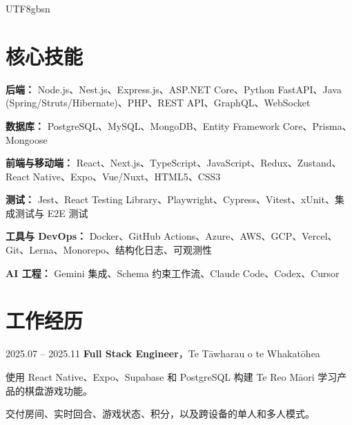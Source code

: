 \documentclass[10pt, letterpaper]{article}
\begin{document}
\begin{CJK*}{UTF8}{gbsn}
    \section{核心技能}
        \begin{onecolentry}
            \textbf{后端：} Node.js、Nest.js、Express.js、ASP.NET Core、Python FastAPI、Java (Spring/Struts/Hibernate)、PHP、REST API、GraphQL、WebSocket
        \end{onecolentry}
        \vspace{0.15 cm}
        \begin{onecolentry}
            \textbf{数据库：} PostgreSQL、MySQL、MongoDB、Entity Framework Core、Prisma、Mongoose
        \end{onecolentry}
        \vspace{0.15 cm}
        \begin{onecolentry}
            \textbf{前端与移动端：} React、Next.js、TypeScript、JavaScript、Redux、Zustand、React Native、Expo、Vue/Nuxt、HTML5、CSS3
        \end{onecolentry}
        \vspace{0.15 cm}
        \begin{onecolentry}
            \textbf{测试：} Jest、React Testing Library、Playwright、Cypress、Vitest、xUnit、集成测试与 E2E 测试
        \end{onecolentry}
        \vspace{0.15 cm}
        \begin{onecolentry}
            \textbf{工具与 DevOps：} Docker、GitHub Actions、Azure、AWS、GCP、Vercel、Git、Lerna、Monorepo、结构化日志、可观测性
        \end{onecolentry}
        \vspace{0.15 cm}
        \begin{onecolentry}
            \textbf{AI 工程：} Gemini 集成、Schema 约束工作流、Claude Code、Codex、Cursor
        \end{onecolentry}

    \section{工作经历}
        \begin{twocolentry}{2025.07 -- 2025.11}
            \textbf{Full Stack Engineer}，Te Tāwharau o te Whakatōhea
        \end{twocolentry}
        \begin{onecolentry}
            \begin{highlights}
                \item 使用 React Native、Expo、Supabase 和 PostgreSQL 构建 Te Reo Māori 学习产品的棋盘游戏功能。
                \item 交付房间、实时回合、游戏状态、积分，以及跨设备的单人和多人模式。
            \end{highlights}
        \end{onecolentry}


\end{CJK*}
\end{document}
